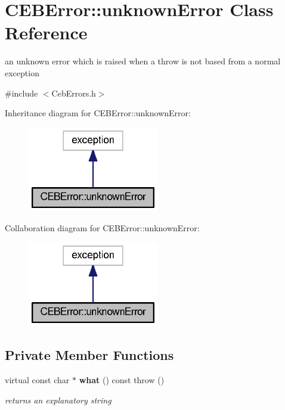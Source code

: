 \section{C\-E\-B\-Error\-:\-:unknown\-Error Class Reference}
\label{class_c_e_b_error_1_1unknown_error}


an unknown error which is raised when a throw is not based from a normal exception  




{\ttfamily \#include $<$Ceb\-Errors.\-h$>$}



Inheritance diagram for C\-E\-B\-Error\-:\-:unknown\-Error\-:\nopagebreak
\begin{figure}[H]
\begin{center}
\leavevmode
\includegraphics[width=162pt]{class_c_e_b_error_1_1unknown_error__inherit__graph}
\end{center}
\end{figure}


Collaboration diagram for C\-E\-B\-Error\-:\-:unknown\-Error\-:\nopagebreak
\begin{figure}[H]
\begin{center}
\leavevmode
\includegraphics[width=162pt]{class_c_e_b_error_1_1unknown_error__coll__graph}
\end{center}
\end{figure}
\subsection*{Private Member Functions}
\begin{DoxyCompactItemize}
\item 
virtual const char $\ast$ {\bf what} () const   throw ()
\begin{DoxyCompactList}\small\item\em returns an explanatory string \end{DoxyCompactList}\end{DoxyCompactItemize}


